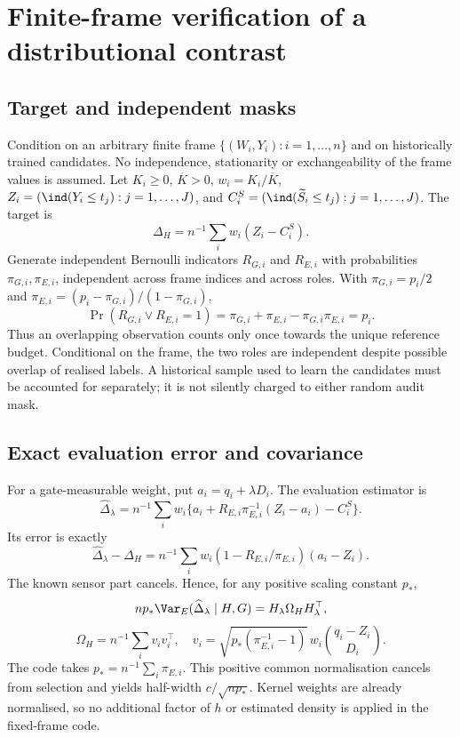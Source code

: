 \section{Finite-frame verification of a distributional contrast}
\subsection{Target and independent masks}
Condition on an arbitrary finite frame $\{(W_i,Y_i):i=1,\ldots,n\}$ and on historically trained candidates. No independence, stationarity or exchangeability of the frame values is assumed. Let $K_i\geq0$, $\overline K>0$, $w_i=K_i/\overline K$, $Z_i=(\ind(Y_i\leq t_j):j=1,\ldots,J)$, and $C_i^S=(\ind(\widetilde S_i\leq t_j):j=1,\ldots,J)$. The target is
\[
 \Delta_H=n^{-1}\sum_iw_i(Z_i-C_i^S).
\]
Generate independent Bernoulli indicators $R_{G,i}$ and $R_{E,i}$ with probabilities $\pi_{G,i},\pi_{E,i}$, independent across frame indices and across roles. With $\pi_{G,i}=p_i/2$ and $\pi_{E,i}=(p_i-\pi_{G,i})/(1-\pi_{G,i})$,
\[
 \Pr(R_{G,i}\lor R_{E,i}=1)=\pi_{G,i}+\pi_{E,i}-\pi_{G,i}\pi_{E,i}=p_i.
\]
Thus an overlapping observation counts only once towards the unique reference budget. Conditional on the frame, the two roles are independent despite possible overlap of realised labels. A historical sample used to learn the candidates must be accounted for separately; it is not silently charged to either random audit mask.

\subsection{Exact evaluation error and covariance}
For a gate-measurable weight, put $a_i=q_i+\lambda D_i$. The evaluation estimator is
\[
 \widehat\Delta_\lambda=n^{-1}\sum_iw_i
 \{a_i+R_{E,i}\pi_{E,i}^{-1}(Z_i-a_i)-C_i^S\}.
\]
Its error is exactly
\begin{equation}\label{eq:designerror}
 \widehat\Delta_\lambda-\Delta_H
 =n^{-1}\sum_iw_i(1-R_{E,i}/\pi_{E,i})(a_i-Z_i).
\end{equation}
The known sensor part cancels. Hence, for any positive scaling constant $p_*$,
\[
 np_*\Var_E(\widehat\Delta_\lambda\mid H,G)
 =H_\lambda\Omega_HH_\lambda^\top,
\]
\begin{equation}\label{eq:designomega}
 \Omega_H=n^{-1}\sum_i v_iv_i^\top,\quad
 v_i=\sqrt{p_*(\pi_{E,i}^{-1}-1)}\,w_i\binom{q_i-Z_i}{D_i}.
\end{equation}
The code takes $p_*=n^{-1}\sum_i\pi_{E,i}$. This positive common normalisation cancels from selection and yields half-width $c/\sqrt{np_*}$. Kernel weights are already normalised, so no additional factor of $h$ or estimated density is applied in the fixed-frame code.

